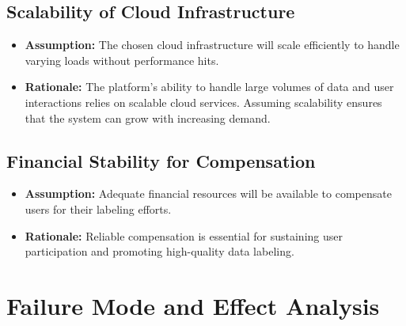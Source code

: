 \documentclass{article}
\begin{document}
\subsection*{Scalability of Cloud Infrastructure}
\begin{itemize}
  \item \textbf{Assumption:} The chosen cloud infrastructure will scale efficiently to handle varying loads without performance hits.
  \item \textbf{Rationale:} The platform's ability to handle large volumes of data and user interactions relies on scalable cloud services. Assuming scalability ensures that the system can grow with increasing demand.
\end{itemize}

\subsection*{Financial Stability for Compensation}
\begin{itemize}
  \item \textbf{Assumption:} Adequate financial resources will be available to compensate users for their labeling efforts.
  \item \textbf{Rationale:} Reliable compensation is essential for sustaining user participation and promoting high-quality data labeling.
\end{itemize}

\newpage
\section{Failure Mode and Effect Analysis}
\end{document}
